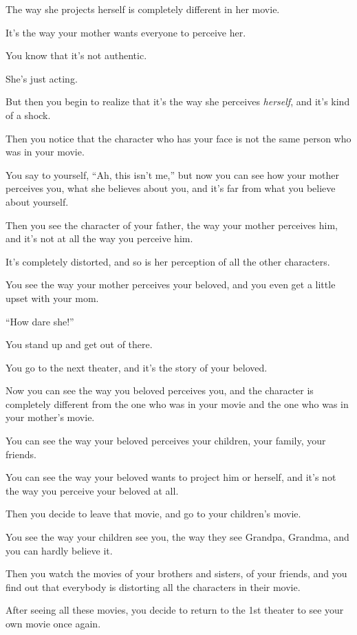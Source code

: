 \documentclass{article}
\numberwithin{equation}{section}
\begin{document}
The way she projects herself is completely different in her movie.

It's the way your mother wants everyone to perceive her.

You know that it's not authentic.

She's just acting.

But then you begin to realize that it's the way she perceives \textit{herself}, and it's kind of a shock.

%
Then you notice that the character who has your face is not the same person who was in your movie.

You say to yourself, ``Ah, this isn't me,'' but now you can see how your mother perceives you, what she believes about you, and it's far from what you believe about yourself.

Then you see the character of your father, the way your mother perceives him, and it's not at all the way you perceive him.

It's completely distorted, and so is her perception of all the other characters.

You see the way your mother perceives your beloved, and you even get a little upset with your mom.

``How dare she!''

You stand up and get out of there.

%
You go to the next theater, and it's the story of your beloved.

Now you can see the way you beloved perceives you, and the character is completely different from the one who was in your movie and the one who was in your mother's movie.

You can see the way your beloved perceives your children, your family, your friends.

You can see the way your beloved wants to project him or herself, and it's not the way you perceive your beloved at all.

Then you decide to leave that movie, and go to your children's movie.

You see the way your children see you, the way they see Grandpa, Grandma, and you can hardly believe it.

Then you watch the movies of your brothers and sisters, of your friends, and you find out that everybody is distorting all the characters in their movie.

%
After seeing all these movies, you decide to return to the 1st theater to see your own movie once again.
\end{document}
